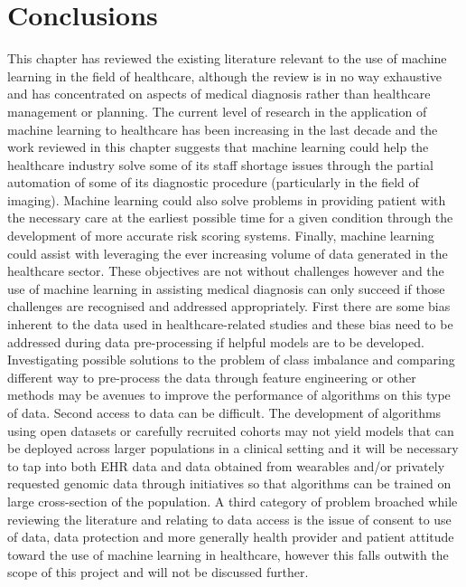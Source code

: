 \section{Conclusions}
This chapter has reviewed the existing literature relevant to the use of machine learning in the field of healthcare, although the review is in no way exhaustive and has concentrated on aspects of medical diagnosis rather than healthcare management or planning.\newline 
The current level of research in the application of machine learning to healthcare has been increasing in the last decade and the work reviewed in this chapter suggests that machine learning could help the healthcare industry solve some of its staff shortage issues through the partial automation of some of its diagnostic procedure (particularly in the field of imaging). Machine learning could also solve problems in providing patient with the necessary care at the earliest possible time for a given condition through the development of more accurate risk scoring systems. Finally, machine learning could assist with leveraging the ever increasing volume of data generated in the healthcare sector.\newline
These objectives are not without challenges however and the use of machine learning in assisting medical diagnosis can only succeed if those challenges are recognised and addressed appropriately.\newline
First there are some bias inherent to the data used in healthcare-related studies and these bias need to be addressed during data pre-processing if helpful models are to be developed. Investigating possible solutions to the problem of class imbalance and comparing different way to pre-process the data through feature engineering or other methods may be avenues to improve the performance of algorithms on this type of data.\newline
Second access to data can be difficult. The development of algorithms using open datasets or carefully recruited cohorts may not yield models that can be deployed across larger populations in a clinical setting and it will be necessary to tap into both EHR data and data obtained from wearables and/or privately requested genomic data through initiatives so that algorithms can be trained on large cross-section of the population.
\newline
A third category of problem broached while reviewing the literature and relating to data access is the issue of consent to use of data, data protection and more generally health provider and patient attitude toward the use of machine learning in healthcare, however this falls outwith the scope of this project and will not be discussed further.\newline




